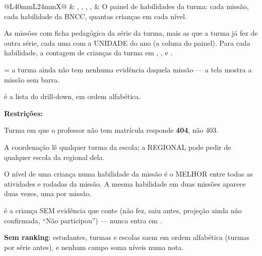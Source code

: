\begin{tabularx}{\linewidth}{@{}L{40mm}L{24mm}X@{}}
\zebra {} & , , , ,  & O painel de habilidades da turma: cada missão, cada habilidade da BNCC, quantas crianças em cada nível.\par As missões com ficha pedagógica da série da turma, mais as que a turma já fez de outra série, cada uma com a UNIDADE do ano (a coluna do painel). Para cada habilidade, a contagem de crianças da turma em , ,  e .\par {} = a turma ainda não tem nenhuma evidência daquela missão --- a tela mostra a missão sem barra.\par {} é a lista do drill-down, em ordem alfabética.\par \textbf{Restrições:}\par \hspace*{1em}\textbullet{} Turma em que o professor não tem matrícula responde \textbf{404}, não 403.\par \hspace*{1em}\textbullet{} A coordenação lê qualquer turma da escola; a REGIONAL pode pedir  de qualquer escola da regional dela.\par \hspace*{1em}\textbullet{} O nível de uma criança numa habilidade da missão é o MELHOR entre todas as atividades e rodadas da missão. A mesma habilidade em duas missões aparece duas vezes, uma por missão.\par \hspace*{1em}\textbullet{}  é a criança SEM evidência que conte (não fez, saiu antes, projeção ainda não confirmada, \enquote{Não participou}) --- nunca entra em .\par \hspace*{1em}\textbullet{} \textbf{Sem ranking}: estudantes, turmas e escolas saem em ordem alfabética (turmas por série antes), e nenhum campo soma níveis numa nota.\\

\end{tabularx}
